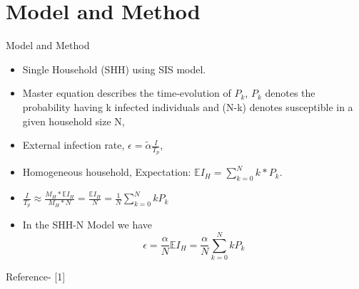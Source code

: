 \documentclass[smaller,aspectratio=169, toc=bibliography]{beamer}
\begin{document}
\section{Model and Method}
\begin{frame}[fragile]{Model and Method}
\begin{itemize}

\item Single Household (SHH) using SIS model.  

\item Master equation describes the time-evolution of $P_k$, $P_k$ denotes the probability having k infected individuals and (N-k) denotes susceptible in a given household size N,
\item External infection rate, $\epsilon=\tilde{\alpha}\frac{I}{T_p}$, 
\item Homogeneous household, Expectation: $\mathbb{E}I_H=\sum_{k=0}^N k*P_k$.
\item $\frac{I}{T_p} \approx \frac{M_H*\mathbb{E}I_H}{M_H*N}=\frac{\mathbb{E}I_H}{N}=\frac{1}{N}{\sum_{k=0}^N kP_k}$
\item In the SHH-N Model we have $$\epsilon=\frac{\alpha}{N}{\mathbb{E}I_H}=\frac{\alpha}{N}{\sum_{k=0}^N kP_k}$$
\end{itemize}
\tiny{Reference- [1]}
\end{frame}
\end{document}

